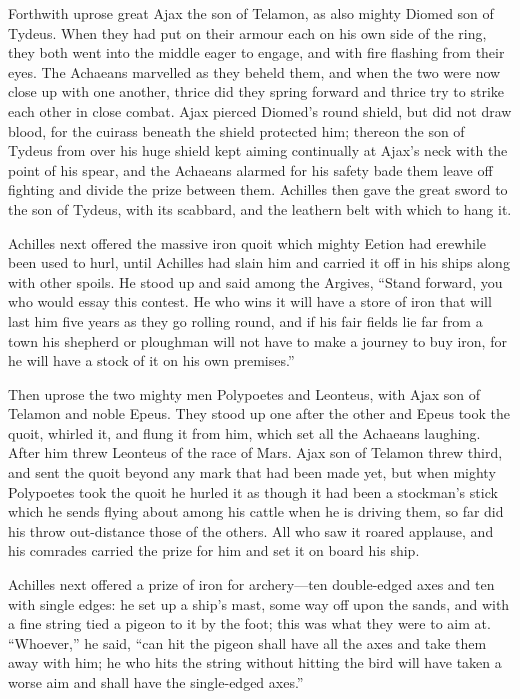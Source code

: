 Forthwith uprose great Ajax the son of Telamon, as also mighty Diomed son
of Tydeus. When they had put on their armour each on his own side of the
ring, they both went into the middle eager to engage, and with fire
flashing from their eyes. The Achaeans marvelled as they beheld them, and
when the two were now close up with one another, thrice did they spring
forward and thrice try to strike each other in close combat. Ajax pierced
Diomed’s round shield, but did not draw blood, for the cuirass beneath the
shield protected him; thereon the son of Tydeus from over his huge shield
kept aiming continually at Ajax’s neck with the point of his spear, and
the Achaeans alarmed for his safety bade them leave off fighting and
divide the prize between them. Achilles then gave the great sword to the
son of Tydeus, with its scabbard, and the leathern belt with which to hang
it.

Achilles next offered the massive iron quoit which mighty Eetion had
erewhile been used to hurl, until Achilles had slain him and carried it
off in his ships along with other spoils. He stood up and said among the
Argives, “Stand forward, you who would essay this contest. He who wins it
will have a store of iron that will last him five years as they go rolling
round, and if his fair fields lie far from a town his shepherd or
ploughman will not have to make a journey to buy iron, for he will have a
stock of it on his own premises.”

Then uprose the two mighty men Polypoetes and Leonteus, with Ajax son of
Telamon and noble Epeus. They stood up one after the other and Epeus took
the quoit, whirled it, and flung it from him, which set all the Achaeans
laughing. After him threw Leonteus of the race of Mars. Ajax son of
Telamon threw third, and sent the quoit beyond any mark that had been made
yet, but when mighty Polypoetes took the quoit he hurled it as though it
had been a stockman’s stick which he sends flying about among his cattle
when he is driving them, so far did his throw out-distance those of the
others. All who saw it roared applause, and his comrades carried the prize
for him and set it on board his ship.

Achilles next offered a prize of iron for archery—ten double-edged
axes and ten with single edges: he set up a ship’s mast, some way off upon
the sands, and with a fine string tied a pigeon to it by the foot; this
was what they were to aim at. “Whoever,” he said, “can hit the pigeon
shall have all the axes and take them away with him; he who hits the
string without hitting the bird will have taken a worse aim and shall have
the single-edged axes.”

